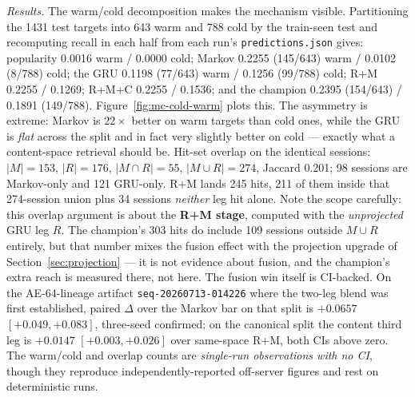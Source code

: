 \documentclass[11pt]{article}
\newcommand{\dsid}[1]{\texttt{\small #1}}
\begin{document}
\emph{Results.} The warm/cold decomposition makes the mechanism visible.
Partitioning the \num{1431} test targets into \num{643} warm and \num{788} cold
by the train-seen test and recomputing recall in each half from each run's
\texttt{predictions.json} gives: popularity \num{0.0016} warm / \num{0.0000}
cold; Markov \num{0.2255} (\num{145}/\num{643}) warm / \num{0.0102}
(\num{8}/\num{788}) cold; the GRU \num{0.1198} (\num{77}/\num{643}) warm /
\num{0.1256} (\num{99}/\num{788}) cold; R+M \num{0.2255} / \num{0.1269}; R+M+C
\num{0.2255} / \num{0.1536}; and the champion \num{0.2395}
(\num{154}/\num{643}) / \num{0.1891} (\num{149}/\num{788}).
Figure~\ref{fig:mc-cold-warm} plots this. The asymmetry is extreme: Markov is
$22\times$ better on warm targets than cold ones, while the GRU is \emph{flat}
across the split and in fact very slightly better on cold --- exactly what a
content-space retrieval should be. Hit-set overlap on the identical sessions:
$|M|=\num{153}$, $|R|=\num{176}$, $|M\cap R|=\num{55}$, $|M\cup R|=\num{274}$,
Jaccard \num{0.201}; \num{98} sessions are Markov-only and \num{121} GRU-only.
R+M lands \num{245} hits, \num{211} of them inside that \num{274}-session union
plus \num{34} sessions \emph{neither} leg hit alone. Note the scope carefully:
this overlap argument is about the \textbf{R+M stage}, computed with the
\emph{unprojected} GRU leg $R$. The champion's \num{303} hits do include
\num{109} sessions outside $M\cup R$ entirely, but that number mixes the fusion
effect with the projection upgrade of Section~\ref{sec:projection} --- it is not
evidence about fusion, and the champion's extra reach is measured there, not
here. The fusion win itself is CI-backed. On the AE-64-lineage artifact
\dsid{seq-20260713-014226} where the two-leg blend was first established, paired
$\Delta$ over the Markov bar on that split is $+\num{0.0657}$
$[+\num{0.049},+\num{0.083}]$, three-seed confirmed; on the canonical split the
content third leg is $+\num{0.0147}$ $[+\num{0.003},+\num{0.026}]$ over
same-space R+M, both CIs above zero. The warm/cold and overlap counts are
\emph{single-run observations with no CI}, though they reproduce
independently-reported off-server figures and rest on deterministic runs.
\end{document}
